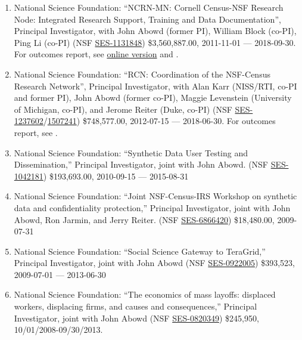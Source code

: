 \documentclass[10pt,letterpaper]{report}
\begin{document}
\begin{enumerate}
\item National Science Foundation: ``NCRN-MN: Cornell Census-NSF Research Node: Integrated Research Support, Training and Data Documentation'', Principal Investigator, with John Abowd (former PI), William Block (co-PI), Ping Li (co-PI) (NSF \href{http://www.nsf.gov/awardsearch/showAward.do?AwardNumber=1131848}{SES-1131848}) \$3,560,887.00, 2011-11-01 --- 2018-09-30. For outcomes report, see  \href{https://ncrncornell.github.io/reports/outcomes-report.html}{online version} and \cite{VilhuberBlock2019}.

\item National Science Foundation: ``RCN: Coordination of the NSF-Census Research Network'', 
Principal Investigator, with Alan Karr (NISS/RTI, co-PI and former PI), John Abowd (former co-PI), Maggie Levenstein (University of Michigan, co-PI), and 
Jerome Reiter (Duke, 
co-PI) (NSF \href{http://www.nsf.gov/awardsearch/showAward.do?AwardNumber=1237602}{SES-1237602}/\href{https://www.nsf.gov/awardsearch/showAward?AWD_ID=1507241}{1507241}) \$748,577.00, 2012-07-15 --- 2018-06-30. For outcomes report, see \cite{ncrn-summary}.

\item National Science Foundation: ``Synthetic Data User Testing and Dissemination,'' Principal Investigator, joint with John Abowd. (NSF \href{http://www.nsf.gov/awardsearch/showAward.do?AwardNumber=1042181}{SES-1042181}) \$193,693.00, 2010-09-15 --- 2015-08-31

\item National Science Foundation: ``Joint NSF-Census-IRS Workshop on
  synthetic data and confidentiality protection,'' Principal Investigator, joint with John Abowd,
  Ron Jarmin, and Jerry Reiter. (NSF \href{http://www.nsf.gov/awardsearch/showAward.do?AwardNumber=6866420}{SES-6866420}) \$18,480.00, 2009-07-31

\item National Science Foundation: ``Social Science Gateway to TeraGrid,''
Principal Investigator,  joint with John Abowd (NSF \href{http://www.nsf.gov/awardsearch/showAward.do?AwardNumber=0922005}{SES-0922005}) \$393,523,  2009-07-01 --- 2013-06-30

\item National Science Foundation: ``The economics of mass layoffs:
  displaced workers, displacing firms, and causes and consequences,''
  Principal Investigator, joint
  with John Abowd (NSF \href{http://www.nsf.gov/awardsearch/showAward.do?AwardNumber=082034}{SES-0820349}) \$245,950,  10/01/2008-09/30/2013.


\end{enumerate}
\end{document}
